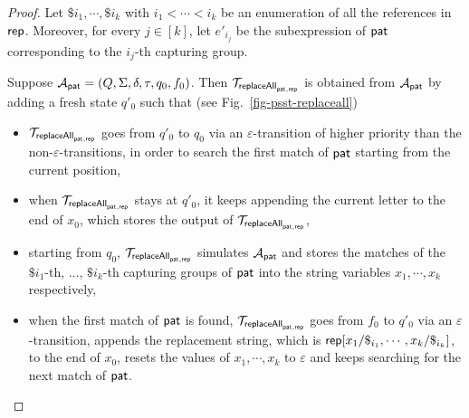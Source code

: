 \begin{proof}
	Let $\$i_1, \cdots, \$i_k$ with $i_1 < \cdots < i_k$ be an enumeration of all the references in $\mathsf{rep}$. 
	Moreover, for every $j \in [k]$, let $e'_{i_j}$ be the subexpression of $\mathsf{pat}$ corresponding to the $i_j$-th capturing group.
	
	Suppose $\mathcal{A}_{\mathsf{pat}} = (Q, \Sigma, \delta, \tau, q_0, f_0)$. Then $\mathcal{T}_{\mathsf{replaceAll}_{\mathsf{pat},\mathsf{rep}}}$ is obtained from $\mathcal{A}_{\mathsf{pat}}$ by adding a fresh state $q'_0$ such that (see Fig.~\ref{fig-psst-replaceall})
	\begin{itemize}
		\item $\mathcal{T}_{\mathsf{replaceAll}_{\mathsf{pat},\mathsf{rep}}}$ goes from $q'_0$ to $q_0$ via an $\varepsilon$-transition of higher priority than the non-$\varepsilon$-transitions, in order to search the first match of $\mathsf{pat}$ starting from the current position, 
		\item when $\mathcal{T}_{\mathsf{replaceAll}_{\mathsf{pat},\mathsf{rep}}}$ stays at $q'_0$, it keeps appending the current letter to the end of $x_0$, which stores the output of $\mathcal{T}_{\mathsf{replaceAll}_{\mathsf{pat},\mathsf{rep}}}$,
		\item starting from $q_0$, $\mathcal{T}_{\mathsf{replaceAll}_{\mathsf{pat},\mathsf{rep}}}$ simulates $\mathcal{A}_{\mathsf{pat}}$ and stores the matches of the $\$i_1$-th, $\ldots$, $\$i_k$-th capturing groups of $\mathsf{pat}$ into the string variables $x_1, \cdots, x_k$ respectively,   
		\item when the first match of $\mathsf{pat}$ is found, $\mathcal{T}_{\mathsf{replaceAll}_{\mathsf{pat},\mathsf{rep}}}$ goes from $f_0$ to $q'_0$ via an $\varepsilon$-transition, appends the replacement string, which is $\mathsf{rep}[x_1/\$_{i_1}, \cdots, x_k/\$_{i_k}]$, to the end of $x_0$, resets the values of $x_1,\cdots,x_k$ to $\varepsilon$ and keeps searching for the next match of $\mathsf{pat}$.
	\end{itemize}
	

\end{proof}
